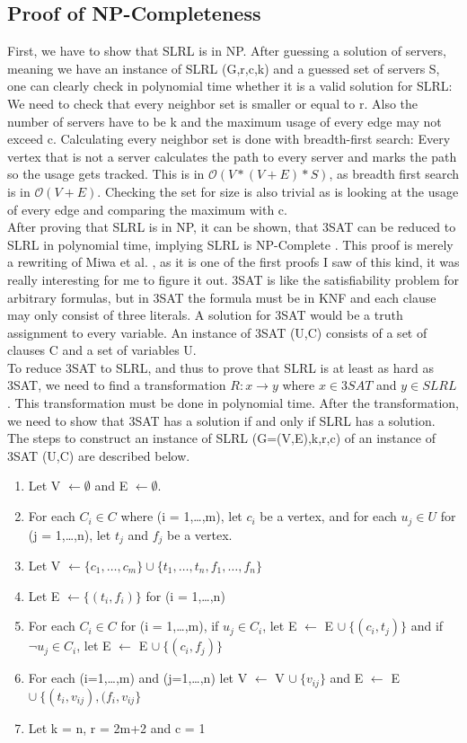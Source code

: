 \documentclass [12pt]{article}
\begin{document}
\subsection{Proof of NP-Completeness}
First, we have to show that SLRL is in NP. After guessing a solution of servers, meaning we 
have an instance of SLRL (G,r,c,k) and a guessed set of servers S, one can clearly check 
in polynomial time whether it is a valid solution for SLRL: We need to check that every neighbor set is smaller
or equal to r. Also the number of servers have to be k and the maximum usage of every edge may not exceed c.
Calculating every neighbor set is done with breadth-first search: Every vertex that is not a server calculates
the path to every server and marks the path so the usage gets tracked. This is in $\mathcal{O}(V*(V+E)*S)$, as breadth first
search is in $\mathcal{O}(V+E)$. Checking the set for size is also trivial as is looking at the usage of
every edge and comparing the maximum with c.\\
After proving that SLRL is in NP, it can be shown, that 3SAT can be reduced to SLRL in polynomial time,
implying SLRL is NP-Complete \cite{Garey:1979:CIG:578533}.
This proof is merely a rewriting of Miwa et al. \cite{mirrorserver}, as it is one of the first proofs I saw of 
this kind, it was really interesting for me to figure it out.
3SAT is like the satisfiability problem for arbitrary formulas, but in 3SAT the formula must be in KNF and 
each clause may only consist of three literals. A solution for 3SAT would be a truth assignment to every
variable. An instance of 3SAT (U,C) consists of a set of clauses C and a set of variables U.\\
To reduce 3SAT to SLRL, and thus to prove that SLRL is at least as hard as 3SAT, we need to find a 
transformation $R: x \rightarrow y$ where $x \in 3SAT$ and $y \in SLRL$. This transformation must be 
done in polynomial time. After the transformation, we need to show that 3SAT has a solution if and only if 
SLRL has a solution.\\
The steps to construct an instance of SLRL (G=(V,E),k,r,c) of an instance of 3SAT (U,C) are described below.
\begin{enumerate}
  \item{Let V $\leftarrow \emptyset$ and E $\leftarrow \emptyset$.}
  \item{For each $C_i \in C$ where (i = 1,\dots,m), let $c_i$ be a vertex, and for each $u_j \in U$ for (j = 1,\dots,n),
    let $t_j$ and $f_j$ be a vertex.}
  \item {Let V $\leftarrow \{c_1, \dots, c_m\} \cup \{t_1, \dots, t_n, f_1, \dots, f_n\} $ }
  \item {Let E $\leftarrow \{(t_i,f_i)\}$ for (i = 1,\dots,n) }
  \item {For each $C_i \in C$ for (i = 1,\dots,m), if $u_j \in C_i$, let E $\leftarrow$ E $\cup \ \{ (c_i ,t_j) \}$
    and if $\neg u_j \in C_i$, let E $\leftarrow$ E $\cup \ \{(c_i,f_j)\}$ }
  \item{For each (i=1,\dots,m) and (j=1,\dots,n) let V $\leftarrow$  V $\cup \ \{v_{ij}\}$ and E $\leftarrow$ E $\cup \ \{(t_i,v_{ij}), (f_i, v_{ij} \}$ }
  \item{Let k = n, r = 2m+2 and c = 1}
\end{enumerate}
\end{document}
